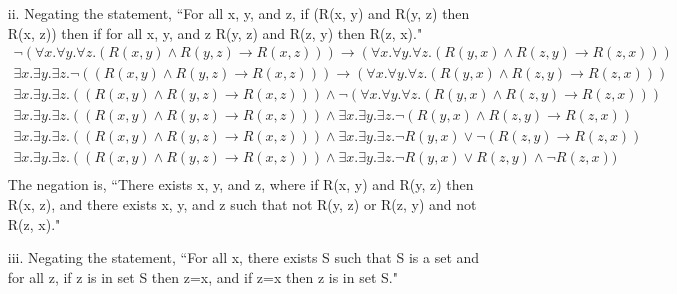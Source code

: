 \documentclass[10pt,letter]{article}
\begin{document}
\begin{enumerate}
\item[ii.] Negating the statement, ``For all x, y, and z, if (R(x, y) and R(y, z) then R(x, z)) then if for all x, y, and z R(y, z) and R(z, y) then R(z, x)."
\begin{gather*}
\neg(\forall x. \forall y. \forall z. (R(x, y) \wedge R(y, z) \rightarrow R(x, z))) \rightarrow (\forall x. \forall y. \forall z. (R(y, x) \wedge R(z, y) \rightarrow R(z, x)))\\
\exists x. \exists y. \exists z. \neg((R(x, y) \wedge R(y, z) \rightarrow R(x, z))) \rightarrow (\forall x. \forall y. \forall z. (R(y, x) \wedge R(z, y) \rightarrow R(z, x)))\\
\exists x. \exists y. \exists z. ((R(x, y) \wedge R(y, z) \rightarrow R(x, z))) \wedge \neg(\forall x. \forall y. \forall z. (R(y, x) \wedge R(z, y) \rightarrow R(z, x)))\\
\exists x. \exists y. \exists z. ((R(x, y) \wedge R(y, z) \rightarrow R(x, z))) \wedge \exists x. \exists y. \exists z. \neg(R(y, x) \wedge R(z, y) \rightarrow R(z, x))\\
\exists x. \exists y. \exists z. ((R(x, y) \wedge R(y, z) \rightarrow R(x, z))) \wedge \exists x. \exists y. \exists z. \neg R(y, x) \vee \neg(R(z, y) \rightarrow R(z, x))\\
\exists x. \exists y. \exists z. ((R(x, y) \wedge R(y, z) \rightarrow R(x, z))) \wedge \exists x. \exists y. \exists z. \neg R(y, x) \vee R(z, y) \wedge \neg R(z, x))\\
\end{gather*}
The negation is, ``There exists x, y, and z, where if R(x, y) and R(y, z) then R(x, z), and there exists x, y, and z such that not R(y, z) or R(z, y) and not R(z, x)."

\item[iii.] Negating the statement, ``For all x, there exists S such that S is a set and for all z, if z is in set S then z=x, and if z=x then z is in set S." 


\end{enumerate}
\end{document}
